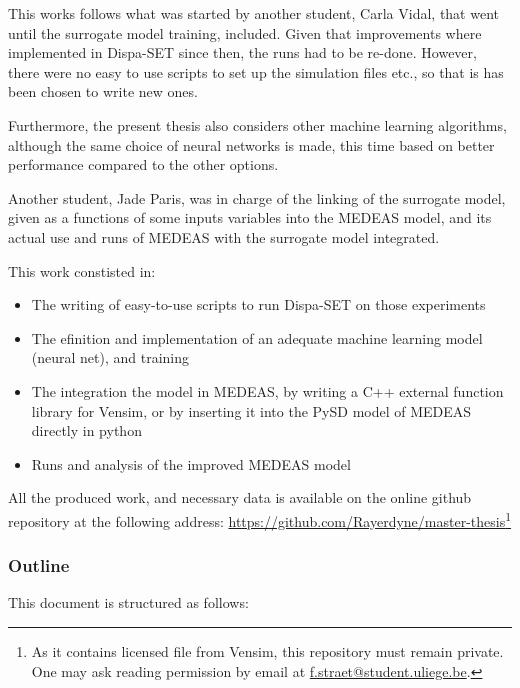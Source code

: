 This works follows what was started by another student, Carla Vidal, that went until the surrogate model training, included. Given that improvements where implemented in Dispa-SET since then, the runs had to be re-done. However, there were no easy to use scripts to set up the simulation files etc., so that is has been chosen to write new ones.

Furthermore, the present thesis also considers other machine learning algorithms, although the same choice of neural networks is made, this time based on better performance compared to the other options.

Another student, Jade Paris, was in charge of the linking of the surrogate model, given as a functions of some inputs variables into the MEDEAS model, and its actual use and runs of MEDEAS with the surrogate model integrated.

This work constisted in:
\begin{itemize}
    \item The writing of easy-to-use scripts to run Dispa-SET on those experiments
    \item The efinition and implementation of an adequate machine learning model (neural net), and training
    \item The integration the model in MEDEAS, by writing a C++ external function library for Vensim, or by inserting it into the PySD model of MEDEAS directly in python
    \item Runs and analysis of the improved MEDEAS model
\end{itemize}

All the produced work, and necessary data is available on the online github repository at the following address: \href{https://github.com/Rayerdyne/master-thesis}{https://github.com/Rayerdyne/master-thesis}\footnote{As it contains licensed file from Vensim, this repository must remain private. One may ask reading permission by email at \href{mailto:f.straet@student.uliege.be}{f.straet@student.uliege.be}.}

\subsubsection{Outline}

This document is structured as follows:

